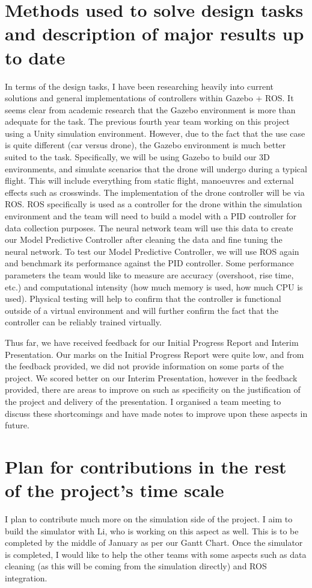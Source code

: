 \documentclass[11pt]{article}
\begin{document}
\section{Methods used to solve design tasks and description of major results up to date}\label{methods}
In terms of the design tasks, I have been researching heavily into current solutions and general implementations of controllers within Gazebo + ROS. It seems clear from academic research that the Gazebo environment is more than adequate for the task. The previous fourth year team working on this project using a Unity simulation environment. However, due to the fact that the use case is quite different (car versus drone), the Gazebo environment is much better suited to the task. Specifically, we will be using Gazebo to build our 3D environments, and simulate scenarios that the drone will undergo during a typical flight. This will include everything from static flight, manoeuvres and external effects such as crosswinds. The implementation of the drone controller will be via ROS. ROS specifically is used as a controller for the drone within the simulation environment and the team will need to build a model with a PID controller for data collection purposes. The neural network team will use this data to create our Model Predictive Controller after cleaning the data and fine tuning the neural network. To test our Model Predictive Controller, we will use ROS again and benchmark its performance against the PID controller. Some performance parameters the team would like to measure are accuracy (overshoot, rise time, etc.) and computational intensity (how much memory is used, how much CPU is used). Physical testing will help to confirm that the controller is functional outside of a virtual environment and will further confirm the fact that the controller can be reliably trained virtually.

Thus far, we have received feedback for our Initial Progress Report and Interim Presentation. Our marks on the Initial Progress Report were quite low, and from the feedback provided, we did not provide information on some parts of the project. We scored better on our Interim Presentation, however in the feedback provided, there are areas to improve on such as specificity on the justification of the project and delivery of the presentation. I organised a team meeting to discuss these shortcomings and have made notes to improve upon these aspects in future.
\section{Plan for contributions in the rest of the project's time scale}
I plan to contribute much more on the simulation side of the project. I aim to build the simulator with Li, who is working on this aspect as well. This is to be completed by the middle of January as per our Gantt Chart. Once the simulator is completed, I would like to help the other teams with some aspects such as data cleaning (as this will be coming from the simulation directly) and ROS integration.
\end{document}
